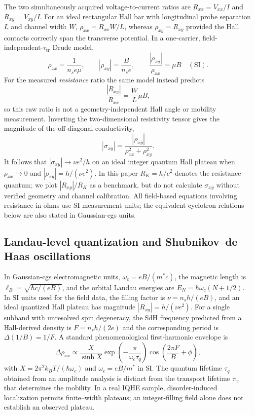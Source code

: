 \documentclass[
    aps,
    prb, 
    twocolumn, superscriptaddress,
    amsmath,
    amssymb,
    floatfix
]{revtex4-2}
\begin{document}
The two simultaneously acquired voltage-to-current ratios are $R_{xx}=V_{xx}/I$ and $R_{xy}=V_{xy}/I$. For an ideal rectangular Hall bar with longitudinal probe separation $L$ and channel width $W$, $\rho_{xx}=R_{xx}W/L$, whereas $\rho_{xy}=R_{xy}$ provided the Hall contacts correctly span the transverse potential. In a one-carrier, field-independent-$\tau_{\mathrm{tr}}$ Drude model,
\begin{equation}
\rho_{xx}=\frac{1}{n_se\mu},\qquad
|\rho_{xy}|=\frac{B}{n_se},\qquad
\frac{|\rho_{xy}|}{\rho_{xx}}=\mu B\quad\mathrm{(SI)}.
\label{eq:hallangle}
\end{equation}
For the measured \emph{resistance} ratio the same model instead predicts
\begin{equation}
\frac{|R_{xy}|}{R_{xx}}=\frac{W}{L}\mu B,
\label{eq:rawratio}
\end{equation}
so this raw ratio is not a geometry-independent Hall angle or mobility measurement. Inverting the two-dimensional resistivity tensor gives the magnitude of the off-diagonal conductivity,
\begin{equation}
|\sigma_{xy}|=\frac{|\rho_{xy}|}{\rho_{xx}^2+\rho_{xy}^2}.
\label{eq:conductivity}
\end{equation}
It follows that $|\sigma_{xy}|\rightarrow \nu e^2/h$ on an ideal integer quantum Hall plateau when $\rho_{xx}\rightarrow0$ and $|\rho_{xy}|=h/(\nu e^2)$. In this paper $R_K=h/e^2$ denotes the resistance quantum; we plot $|R_{xy}|/R_K$ as a benchmark, but do not calculate $\sigma_{xy}$ without verified geometry and channel calibration. All field-based equations involving resistance in ohms use SI measurement units; the equivalent cyclotron relations below are also stated in Gaussian-cgs units.

\subsection{Landau-level quantization and Shubnikov--de Haas oscillations}
In Gaussian-cgs electromagnetic units, $\omega_c=eB/(m^*c)$, the magnetic length is $\ell_B=\sqrt{\hbar c/(eB)}$, and the orbital Landau energies are $E_N=\hbar\omega_c(N+1/2)$. In SI units used for the field data, the filling factor is $\nu=n_sh/(eB)$, and an ideal quantized Hall plateau has magnitude $|R_{xy}|=h/(\nu e^2)$. For a single subband with unresolved spin degeneracy, the SdH frequency predicted from a Hall-derived density is $F=n_sh/(2e)$ and the corresponding period is $\Delta(1/B)=1/F$. A standard phenomenological first-harmonic envelope is
\begin{equation}
\Delta\rho_{xx}\propto\frac{X}{\sinh X}\exp\!\left(-\frac{\pi}{\omega_c\tau_q}\right)\cos\!\left(\frac{2\pi F}{B}+\phi\right),\label{eq:sdh}
\end{equation}
with $X=2\pi^2k_BT/(\hbar\omega_c)$ and $\omega_c=eB/m^*$ in SI. The quantum lifetime $\tau_q$ obtained from an amplitude analysis is distinct from the transport lifetime $\tau_{\mathrm{tr}}$ that determines the mobility. In a real IQHE sample, disorder-induced localization permits finite--width plateaus; an integer-filling field alone does not establish an observed plateau\cite{chakraborty1995,klitzing1980}.
\end{document}
